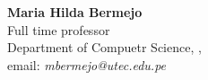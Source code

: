 \noindent \textbf{Maria Hilda Bermejo}\\ 
Full time professor \\
Department of Compuetr Science, \University, \city\\
email: \textit{mbermejo@utec.edu.pe}\\

